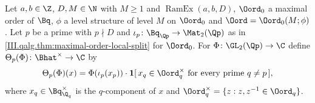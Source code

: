 Let $a,b\in\Z$, $D,M\in\N$ with $M\ge1$ and $\operatorname{RamEx}(a,b,D)$, $\Oord_0$ a maximal order of $\Bq$, $\phi$ a level structure of
level $M$ on $\Oord_0$ and $\Oord=\Oord_0(M;\phi)$. Let $p$ be a prime with $p\nmid D$ and $\iota_p\colon\Bq_{\Qp}\to\Mat_2(\Qp)$ as in
\cref{III.qalg.thm:maximal-order-local-split} for $\Oord_0$. For $\Phi\colon\GL_2(\Qp)\to\C$ define $\Theta_p(\Phi)\colon\Bhat^\times\to\C$ by
\[
  \Theta_p(\Phi)(x)=\Phi(\iota_p(x_p))\cdot\mathbf 1[\,x_q\in\Oord_q^\times\text{ for every prime }q\ne p\,],
\]
where $x_q\in\Bq_{\Q_q}^\times$ is the $q$-component of $x$ and $\Oord_q^\times=\{z:z,z^{-1}\in\Oord_q\}$.
